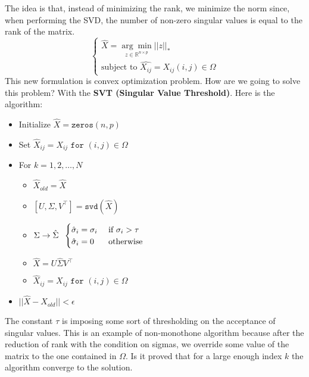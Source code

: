 The idea is that, instead of minimizing the rank, we minimize the norm since, when performing the SVD, the number of non-zero singular values is equal to the rank of the matrix.
\[
    \begin{cases}
        \hat{X} = \underset{z \in \mathbb{R}^{n \times p}}{\arg \min} ||z||_*\\
        \text{subject to } \hat{X_{ij}} = X_{ij} (i,j) \in \Omega
    \end{cases}    
\]
This new formulation is convex optimization problem. How are we going to solve this problem? With the \textbf{SVT (Singular Value Threshold)}. Here is the algorithm:
\begin{itemize}
    \item Initialize $\hat{X} = \texttt{zeros}(n,p)$
    \item Set $\hat{X}_{ij} = X_{ij} \texttt{ for } (i,j) \in \Omega$
    \item For $k = 1,2, \dots, N$  
    \begin{itemize}
        \item $\hat{X}_{old} = \hat{X}$
        \item $[U, \Sigma, V^\intercal] = \texttt{svd}(\hat{X})$
        \item $\Sigma \rightarrow \hat{\Sigma} \hspace{0.2cm} \begin{cases}
            \hat{\sigma}_i = \sigma_i & \text{ if } \sigma_i > \tau\\
            \hat{\sigma}_i = 0 & \text{ otherwise }
        \end{cases}$
        \item $\hat{X} = U\hat{\Sigma}V^\intercal$
        \item $\hat{X}_{ij} = X_{ij} \texttt{ for } (i,j) \in \Omega$
    \end{itemize}
    \item $||\hat{X} - X_{old}|| < \epsilon$
\end{itemize}
The constant $\tau$ is imposing some sort of thresholding on the acceptance of singular values. This is an example of non-monothone algorithm because after the reduction of rank with the condition on sigmas, we override some value of the matrix to the one contained in $\Omega$. Is it proved that for a large enough index $k$ the algorithm converge to the solution. 